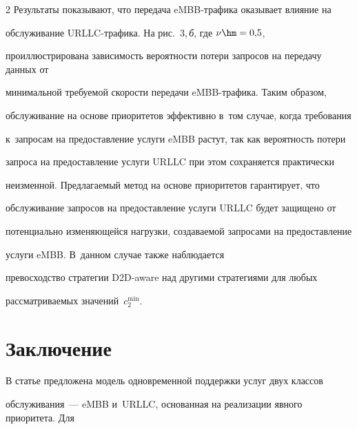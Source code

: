 \begin{multicols}{2}
Результаты показывают, что передача eMBB-тра\-фи\-ка оказывает влияние на 


обслуживание URLLC-тра\-фи\-ка. На рис.~3,\,\textit{б}, где $\nu \hm= 0{,}5$, 


проиллюстрирована за\-ви\-си\-мость ве\-ро\-ят\-ности потери запросов на передачу данных от 


минимальной тре\-бу\-емой ско\-рости передачи \mbox{eMBB}-тра\-фи\-ка. Таким образом, 


обслуживание на основе приоритетов эффективно в~том случае, когда требования 


к~запросам на предостав\-ле\-ние услуги \mbox{eMBB} растут, так как вероятность потери 


запроса на предостав\-ле\-ние услуги \mbox{URLLC} при этом сохраняется практически 


неизменной. Предлагаемый метод на основе приоритетов гарантирует, что 


обслуживание запросов на предостав\-ле\-ние услуги \mbox{URLLC} будет защищено от 


потенциально из\-ме\-ня\-юще\-йся нагрузки, создаваемой запросами на предостав\-ле\-ние 


услуги \mbox{eMBB}. В~данном случае также наблюдается 


превосходство стратегии D2D-aware над другими стратегиями для любых 


рас\-смат\-ри\-ва\-емых значений~$c_{2}^{\min}$.





\vspace*{-6pt}





\section{Заключение}







\vspace*{-3pt}





В статье предложена модель одновременной поддержки услуг двух классов 


обслуживания~--- \mbox{eMBB} и~\mbox{URLLC}, основанная на реализации явного приоритета. Для 



\end{multicols}
